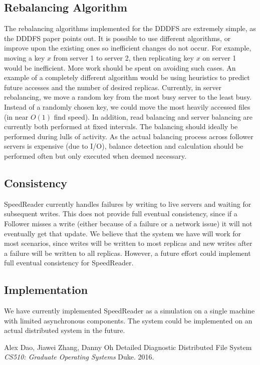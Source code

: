 \documentclass[twoside]{article}
\begin{document}
\begin{multicols}{2}
\subsection*{Rebalancing Algorithm}
The rebalancing algorithms implemented for the DDDFS are extremely simple, as the DDDFS paper points out. It is possible to use different algorithms, or improve upon the existing ones so inefficient changes do not occur. For example, moving a key $x$ from server 1 to server 2, then replicating key $x$ on server 1 would be inefficient. More work should be spent on avoiding such cases. An example of a completely different algorithm would be using heuristics to predict future accesses and the number of desired replicas. Currently, in server rebalancing, we move a random key from the most busy server to the least busy. Instead of a randomly chosen key, we could move the most heavily accessed files (in near $O(1)$ find speed). In addition, read balancing and server balancing are currently both performed at fixed intervals. The balancing should ideally be performed during lulls of activity. As the actual balancing process across follower servers is expensive (due to I/O), balance detection and calculation should be performed often but only executed when deemed necessary.

\subsection*{Consistency}
SpeedReader currently handles failures by writing to live servers and waiting for subsequent writes. This does not provide full eventual consistency, since if a Follower misses a write (either because of a failure or a network issue) it will not eventually get that update. We believe that the system we have will work for most scenarios, since writes will be written to most replicas and new writes after a failure will be written to all replicas. However, a future effort could implement full eventual consistency for SpeedReader.

\subsection*{Implementation}
We have currently implemented SpeedReader as a simulation on a single machine with limited asynchronous components. The system could be implemented on an actual distributed system in the future.

\begin{thebibliography}{99} %
 Alex Dao, Jiawei Zhang, Danny Oh
\newblock Detailed Diagnostic Distributed File System
\newblock \textit{CS510: Graduate Operating Systems}
\newblock Duke. 2016.


\end{thebibliography}
\end{multicols}
\end{document}
